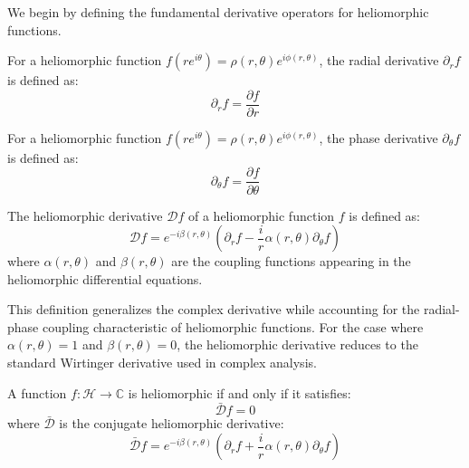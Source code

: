 We begin by defining the fundamental derivative operators for heliomorphic functions.

\begin{definition}
For a heliomorphic function $f(re^{i\theta}) = \rho(r,\theta)e^{i\phi(r,\theta)}$, the radial derivative $\partial_r f$ is defined as:
\begin{equation}
\partial_r f = \frac{\partial f}{\partial r}
\end{equation}
\end{definition}

\begin{definition}
For a heliomorphic function $f(re^{i\theta}) = \rho(r,\theta)e^{i\phi(r,\theta)}$, the phase derivative $\partial_\theta f$ is defined as:
\begin{equation}
\partial_\theta f = \frac{\partial f}{\partial \theta}
\end{equation}
\end{definition}

\begin{definition}
The heliomorphic derivative $\mathcal{D}f$ of a heliomorphic function $f$ is defined as:
\begin{equation}
\mathcal{D}f = e^{-i\beta(r,\theta)}\left(\partial_r f - \frac{i}{r}\alpha(r,\theta)\partial_\theta f\right)
\end{equation}
where $\alpha(r,\theta)$ and $\beta(r,\theta)$ are the coupling functions appearing in the heliomorphic differential equations.
\end{definition}

This definition generalizes the complex derivative while accounting for the radial-phase coupling characteristic of heliomorphic functions. For the case where $\alpha(r,\theta) = 1$ and $\beta(r,\theta) = 0$, the heliomorphic derivative reduces to the standard Wirtinger derivative used in complex analysis.

\begin{theorem}
A function $f: \mathcal{H} \rightarrow \mathbb{C}$ is heliomorphic if and only if it satisfies:
\begin{equation}
\bar{\mathcal{D}}f = 0
\end{equation}
where $\bar{\mathcal{D}}$ is the conjugate heliomorphic derivative:
\begin{equation}
\bar{\mathcal{D}}f = e^{-i\beta(r,\theta)}\left(\partial_r f + \frac{i}{r}\alpha(r,\theta)\partial_\theta f\right)
\end{equation}
\end{theorem}

